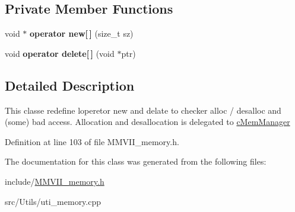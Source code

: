 \subsection*{Private Member Functions}
\begin{DoxyCompactItemize}
\item 
void $\ast$ {\bfseries operator new\mbox{[}$\,$\mbox{]}} (size\+\_\+t sz)\hypertarget{classMMVII_1_1cMemCheck_abfc6032c5cd505f5298a0c8d81e36675}{}\label{classMMVII_1_1cMemCheck_abfc6032c5cd505f5298a0c8d81e36675}

\item 
void {\bfseries operator delete\mbox{[}$\,$\mbox{]}} (void $\ast$ptr)\hypertarget{classMMVII_1_1cMemCheck_abc27bca4311947391e78686888298882}{}\label{classMMVII_1_1cMemCheck_abc27bca4311947391e78686888298882}

\end{DoxyCompactItemize}


\subsection{Detailed Description}
This classe redefine l\textquotesingle{}operetor new and delate to checker alloc / desalloc and (some) bad access. Allocation and desallocation is delegated to \hyperlink{classMMVII_1_1cMemManager}{c\+Mem\+Manager} 

Definition at line 103 of file M\+M\+V\+I\+I\+\_\+memory.\+h.



The documentation for this class was generated from the following files\+:\begin{DoxyCompactItemize}
\item 
include/\hyperlink{MMVII__memory_8h}{M\+M\+V\+I\+I\+\_\+memory.\+h}\item 
src/\+Utils/uti\+\_\+memory.\+cpp\end{DoxyCompactItemize}
